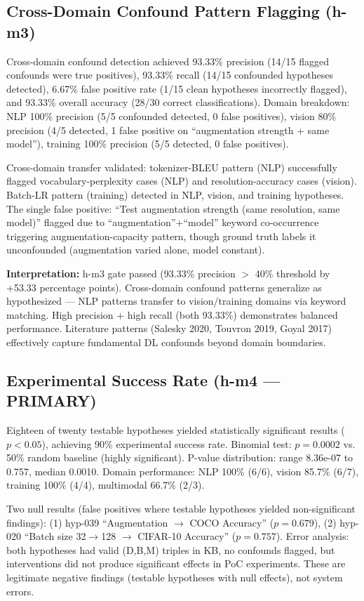 \subsection{Cross-Domain Confound Pattern Flagging (h-m3)}

Cross-domain confound detection achieved 93.33\% precision (14/15 flagged confounds were true positives), 93.33\% recall (14/15 confounded hypotheses detected), 6.67\% false positive rate (1/15 clean hypotheses incorrectly flagged), and 93.33\% overall accuracy (28/30 correct classifications). Domain breakdown: NLP 100\% precision (5/5 confounded detected, 0 false positives), vision 80\% precision (4/5 detected, 1 false positive on ``augmentation strength + same model''), training 100\% precision (5/5 detected, 0 false positives).

Cross-domain transfer validated: tokenizer-BLEU pattern (NLP) successfully flagged vocabulary-perplexity cases (NLP) and resolution-accuracy cases (vision). Batch-LR pattern (training) detected in NLP, vision, and training hypotheses. The single false positive: ``Test augmentation strength (same resolution, same model)'' flagged due to ``augmentation''+``model'' keyword co-occurrence triggering augmentation-capacity pattern, though ground truth labels it unconfounded (augmentation varied alone, model constant).

\textbf{Interpretation:} h-m3 gate passed (93.33\% precision $>$ 40\% threshold by +53.33 percentage points). Cross-domain confound patterns generalize as hypothesized --- NLP patterns transfer to vision/training domains via keyword matching. High precision + high recall (both 93.33\%) demonstrates balanced performance. Literature patterns (Salesky 2020, Touvron 2019, Goyal 2017) effectively capture fundamental DL confounds beyond domain boundaries.

\subsection{Experimental Success Rate (h-m4 --- PRIMARY)}

Eighteen of twenty testable hypotheses yielded statistically significant results ($p < 0.05$), achieving 90\% experimental success rate. Binomial test: $p = 0.0002$ vs. 50\% random baseline (highly significant). P-value distribution: range 8.36e-07 to 0.757, median 0.0010. Domain performance: NLP 100\% (6/6), vision 85.7\% (6/7), training 100\% (4/4), multimodal 66.7\% (2/3).

Two null results (false positives where testable hypotheses yielded non-significant findings): (1) hyp-039 ``Augmentation $\rightarrow$ COCO Accuracy'' ($p = 0.679$), (2) hyp-020 ``Batch size 32$\rightarrow$128 $\rightarrow$ CIFAR-10 Accuracy'' ($p = 0.757$). Error analysis: both hypotheses had valid (D,B,M) triples in KB, no confounds flagged, but interventions did not produce significant effects in PoC experiments. These are legitimate negative findings (testable hypotheses with null effects), not system errors.

